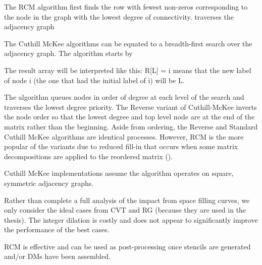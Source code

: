 \documentclass{report}
\begin{document}
The RCM algorithm first finds the row with fewest non-zeros corresponding to the node in the graph with the lowest degree of connectivity.  traverses the adjacency graph 
 
The Cuthill McKee algorithms can be equated to a breadth-first search over the adjacency graph. The algorithm starts by 
% 

The result array will be interpreted like this: R[L] = i means that the new label of node i (the one that had the initial label of i) will be L.


The algorithm queues nodes in order of degree at each level of the search and traverses the lowest degree priority. The Reverse variant of Cuthill-McKee inverts the node order so that the lowest degree and top level node are at the end of the matrix rather than the beginning. Aside from ordering, the Reverse and Standard Cuthill McKee algorithms are identical processes. However, RCM is the more popular of the variants due to reduced fill-in that occurs when some matrix decompositions are applied to the reordered matrix (\cite{LiuSherman1976}).


Cuthill McKee implementations assume the algorithm operates on square, symmetric adjacency graphs. 




Rather than complete a full analysis of the impact from space filling curves, we only consider the ideal cases from CVT and RG (because they are used in the thesis). The integer dilation is costly and does not appear to significantly improve the performance of the best cases.

RCM is effective and can be used as post-processing once stencils are generated and/or DMs have been assembled. 
\end{document}
